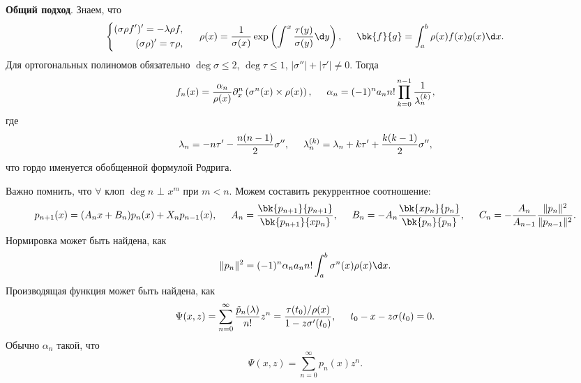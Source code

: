 
\textbf{Общий подход}. 
Знаем, что
\begin{equation*}
    \left\{\begin{aligned}
        (\sigma \rho f')' = - \lambda \rho f, \\
        (\sigma \rho)' =  \tau \rho,
    \end{aligned}\right.
    \hspace{5 mm} 
    \rho(x) = \frac{1}{\sigma(x)} \exp\left(
        \int_{}^{x} \frac{\tau(y)}{\sigma(y)} \d y
    \right),
    \hspace{5 mm} 
    \bk{f}{g} = \int_{a}^{b} \rho(x) f(x) g(x) \d x.
\end{equation*}
Для ортогональных полиномов обязательно $\deg \sigma \leq 2$, $\deg \tau \leq 1$, $|\sigma''|+ |\tau'| \neq 0$. Тогда
\begin{equation*}
    f_n (x) = \frac{\alpha_n}{\rho(x)} \partial_x^n \left(\sigma^n (x) \times \rho(x)\right), \hspace{5 mm}     
    \alpha_n = (-1)^n a_n n! \prod_{k=0}^{n-1} \frac{1}{\lambda_n^{(k)}},
\end{equation*}
где 
\begin{equation*}
    \lambda_n = - n \tau' - \frac{n (n-1)}{2} \sigma'',
    \hspace{5 mm} 
    \lambda_n^{(k)} = \lambda_n + k \tau' + \frac{k (k-1)}{2} \sigma'',
\end{equation*}
что гордо именуется обобщенной формулой Родрига. 

Важно помнить, что $\forall$ клоп $\deg n$ $\bot$ $x^m$ при $m < n$. Можем составить рекуррентное соотношение:
\begin{equation*}
    p_{n+1} (x) = (A_n x + B_n) p_n (x) + X_n p_{n-1} (x),
    \hspace{5 mm} 
    A_n = \frac{
        \bk{p_{n+1}}{p_{n+1}}
    }{
        \bk{p_{n+1}}{x p_n}
    },
    \hspace{5 mm} 
    B_n = -A_n \frac{\bk{x p_n}{p_n}}{\bk{p_n}{p_n}},
    \hspace{5 mm} 
    C_n = - \frac{A_n}{A_{n-1}} \frac{\|p_n\|^2}{\|p_{n-1}\|^2}.
\end{equation*}
Нормировка может быть найдена, как
\begin{equation*}
    \|p_n\|^2 = (-1)^n \alpha_n a_n n! \int_{a}^{b} \sigma^n (x) \rho(x) \d x.
\end{equation*}
Производящая функция может быть найдена, как
\begin{equation*}
    \Psi(x, z) = \sum_{n=0}^{\infty}  \frac{\tilde{p}_n (\lambda)}{n!} z^n = 
    \frac{\tau(t_0)/ \rho(x)}{1 - z \sigma' (t_0)},
    \hspace{5 mm} 
    t_0 - x -  z \sigma(t_0) = 0.
\end{equation*}
Обычно $\alpha_n$ такой, что
\begin{equation*}
    \Psi(x, z) = \sum_{n=0}^{\infty} p_n (x) z^n.
\end{equation*}







